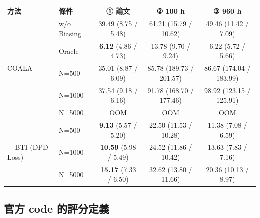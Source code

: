 \documentclass[11pt,a4paper]{article}
\begin{document}
\begin{center}
{\small
\begin{tabular}{llccc}
\toprule
\textbf{方法} & \textbf{條件} & \textbf{① 論文} & \textbf{② 100 h} & \textbf{③ 960 h} \\
\midrule
\multirow{5}{*}{COALA}
 & w/o Biasing & 39.49 (8.75 / 5.48) & 61.21 (15.79 / 10.62) & 49.46 (11.42 / 7.09) \\
 & Oracle      & \textbf{6.12} (4.86 / 4.73) & 13.78 (9.70 / 9.24) & 6.22 (5.72 / 5.66) \\
 & N=500       & 35.01 (8.87 / 6.09) & 85.78 (189.73 / 201.57) & 86.67 (174.04 / 183.99) \\
 & N=1000      & 37.54 (9.18 / 6.16) & 91.78 (168.70 / 177.46) & 98.92 (123.15 / 125.91) \\
 & N=5000      & OOM & OOM & OOM \\
\midrule
\multirow{3}{*}{+ BTI (DPD-Loss)}
 & N=500       & \textbf{9.13} (5.57 / 5.20) & 22.50 (11.53 / 10.28) & 11.38 (7.08 / 6.59) \\
 & N=1000      & \textbf{10.59} (5.98 / 5.49) & 24.52 (11.86 / 10.42) & 13.63 (7.83 / 7.16) \\
 & N=5000      & \textbf{15.17} (7.33 / 6.50) & 32.62 (13.80 / 11.66) & 20.36 (10.13 / 8.97) \\
\bottomrule
\end{tabular}
}
\end{center}

\subsection*{官方 code 的評分定義}
\end{document}
